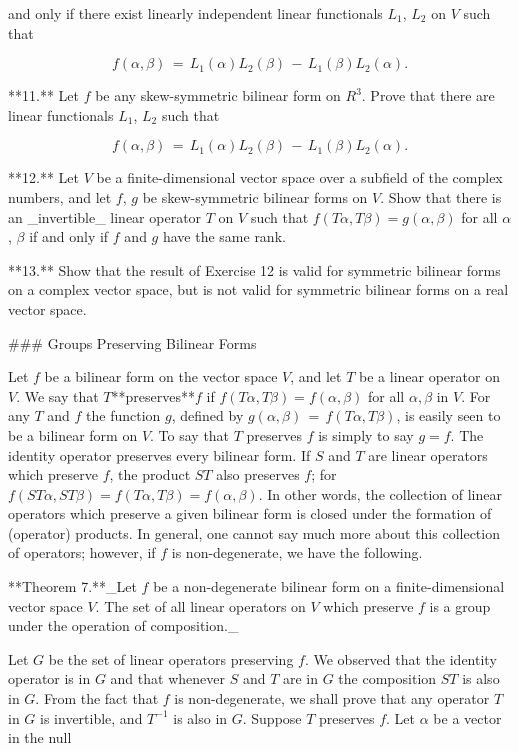 and only if there exist linearly independent linear functionals \(L_{1}\), \(L_{2}\) on \(V\) such that

\[f(\alpha,\beta)\,=\,L_{1}(\alpha)L_{2}(\beta)\,-\,L_{1}(\beta)L_{2}(\alpha).\]

**11.** Let \(f\) be any skew-symmetric bilinear form on \(R^{3}\). Prove that there are linear functionals \(L_{1}\), \(L_{2}\) such that

\[f(\alpha,\beta)\,=\,L_{1}(\alpha)L_{2}(\beta)\,-\,L_{1}(\beta)L_{2}(\alpha).\]

**12.** Let \(V\) be a finite-dimensional vector space over a subfield of the complex numbers, and let \(f\), \(g\) be skew-symmetric bilinear forms on \(V\). Show that there is an _invertible_ linear operator \(T\) on \(V\) such that \(f(T\alpha,T\beta)=g(\alpha,\beta)\) for all \(\alpha\), \(\beta\) if and only if \(f\) and \(g\) have the same rank.

**13.** Show that the result of Exercise 12 is valid for symmetric bilinear forms on a complex vector space, but is not valid for symmetric bilinear forms on a real vector space.

### Groups Preserving Bilinear Forms

Let \(f\) be a bilinear form on the vector space \(V\), and let \(T\) be a linear operator on \(V\). We say that \(T\)**preserves**\(f\) if \(f(T\alpha,T\beta)=f(\alpha,\beta)\) for all \(\alpha,\beta\) in \(V\). For any \(T\) and \(f\) the function \(g\), defined by \(g(\alpha,\beta)\,=\,f(T\alpha,T\beta)\), is easily seen to be a bilinear form on \(V\). To say that \(T\) preserves \(f\) is simply to say \(g=f\). The identity operator preserves every bilinear form. If \(S\) and \(T\) are linear operators which preserve \(f\), the product \(ST\) also preserves \(f\); for \(f(ST\alpha,ST\beta)=f(T\alpha,T\beta)=f(\alpha,\beta)\). In other words, the collection of linear operators which preserve a given bilinear form is closed under the formation of (operator) products. In general, one cannot say much more about this collection of operators; however, if \(f\) is non-degenerate, we have the following.

**Theorem 7.**_Let \(f\) be a non-degenerate bilinear form on a finite-dimensional vector space \(V\). The set of all linear operators on \(V\) which preserve \(f\) is a group under the operation of composition._

Let \(G\) be the set of linear operators preserving \(f\). We observed that the identity operator is in \(G\) and that whenever \(S\) and \(T\) are in \(G\) the composition \(ST\) is also in \(G\). From the fact that \(f\) is non-degenerate, we shall prove that any operator \(T\) in \(G\) is invertible, and \(T^{-1}\) is also in \(G\). Suppose \(T\) preserves \(f\). Let \(\alpha\) be a vector in the null 